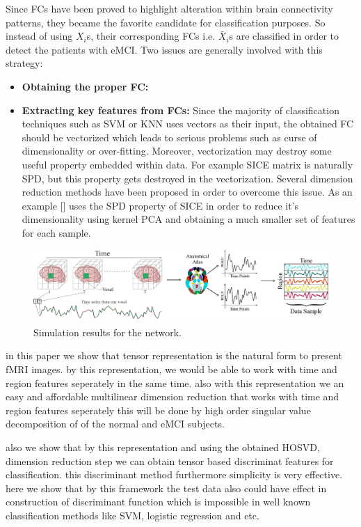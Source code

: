 \documentclass[journal]{IEEEtran}
\begin{document}
Since FCs have been proved to highlight alteration within brain connectivity patterns, they became the favorite candidate for classification purposes. So instead of using $X_i$s, their corresponding FCs i.e. $\bar{X}_i$s are classified in order to detect the patients with eMCI. Two issues are generally
involved with this strategy:
  
\begin{itemize}
	\item \textbf{Obtaining the proper FC:}
	
	
	\item \textbf{Extracting key features from FCs:}
	Since the majority of classification techniques such as SVM or KNN uses vectors as their input, the obtained FC should be vectorized which leads to serious problems such as curse of dimensionality or over-fitting. Moreover, vectorization may destroy some useful property embedded within data. For example SICE matrix is naturally SPD, but this property gets destroyed in the vectorization. Several dimension reduction methods have been proposed in order to overcome this issue. As an example [] uses the SPD property of SICE in order to reduce it's dimensionality using kernel PCA and obtaining a much smaller set of features for each sample. 
\end{itemize}

	
	\begin{figure}[!t]
		\centering
		\includegraphics[width=6in]{Data}
		
		\caption{Simulation results for the network.}
		\label{g1.1}
	\end{figure}


in this paper we show that tensor representation is the natural form to present fMRI images. by this representation, we would be able to work with time and region features seperately in the same time. also with this representation we an easy and affordable multilinear dimension reduction that works with time and region features seperately this will be done by high order singular value decomposition of of the normal and eMCI subjects.
	
	also we show that by this representation and using the obtained HOSVD, dimension reduction step we can obtain tensor based discriminat features for classification. this discriminant method furthermore simplicity is very effective. here we show that by this framework the test data also could have effect in construction of discriminant function which is impossible in well known classification methods like SVM, logistic regression and etc. 
	
\end{document}
